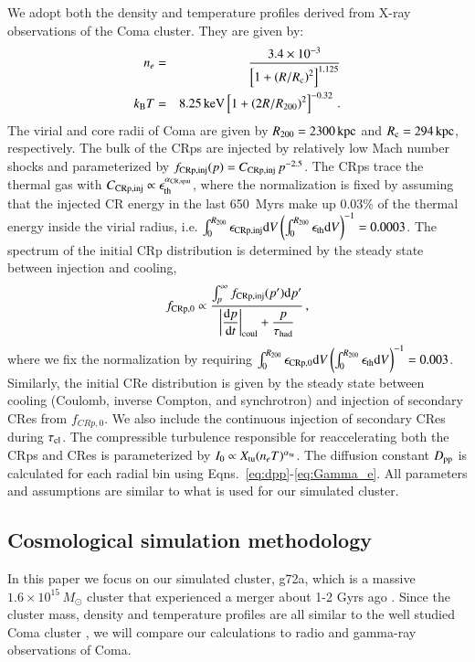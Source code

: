 \documentclass[fleqn,usenatbib,useAMS]{mnras}
\begin{document}
We adopt both the density \citep{1992A&A...259L..31B} and temperature
profiles \citep{2009ApJ...696.1886B,2001A&A...365L..67A} derived from
X-ray observations of the Coma cluster. They are given by:
\begin{eqnarray}
n_e &=& \frac{3.4\times10^{-3}}{\left[1+\left(R/R_{{\mathrm{c}}}\right)^2\right]^{1.125}}\nonumber\\
k_{{\mathrm{B}}} T &=& 8.25\,{\mathrm{keV}} \left[1+\left(2R/R_{200}\right)^2\right]^{-0.32}\,.
\end{eqnarray}
The virial and core radii of Coma are given by $R_{200} =
2300\,{\mathrm{kpc}}$ and $R_{{\mathrm{c}}} = 294\,{\mathrm{kpc}}$, respectively.
The bulk of the CRps are injected by relatively low Mach number shocks
and parameterized by $f_{\mathrm{CRp,inj}}(p) =
C_{\mathrm{CRp,inj}}\,p^{-2.5}$. The CRps trace the thermal gas with
$C_{\mathrm{CRp,inj}} \propto \epsilon_{\mathrm{th}}^{\alpha_{\mathrm{CR,spat}}}$,
where the normalization is fixed by assuming that the injected CR
energy in the last 650~Myrs make up 0.03\% of the thermal energy
inside the virial radius, i.e.
$\int_0^{R_{200}}\epsilon_{\mathrm{CRp,inj}} {\mathrm{d}}
V\left(\int_0^{R_{200}}\epsilon_{\mathrm{th}} {\mathrm{d}}V\right)^{-1} =
0.0003$. The spectrum of the initial CRp distribution is determined by
the steady state between injection and cooling,
\begin{equation}
 f_{\mathrm{CRp,0}} \propto \frac{\int_p^\infty f_{\mathrm{CRp,inj}}(p') 
{\mathrm{d}}p'}{\displaystyle\left|{{{\mathrm{d}}p}\over{{\mathrm{d}}t}}\right|_{\rm coul}+\frac{p}{\tau_{\rm had}}}\,,
\end{equation}
where we fix the normalization by requiring
$\int_0^{R_{200}}\epsilon_{\mathrm{CRp,0}}
{\mathrm{d}}V\left(\int_0^{R_{200}}\epsilon_{\mathrm{th}} {\mathrm{d}}V\right)^{-1} =
0.003$. Similarly, the initial CRe distribution is given by the steady
state between cooling (Coulomb, inverse Compton, and synchrotron) and
injection of secondary CRes from $f_{CRp,0}$. We also include the
continuous injection of secondary CRes during $\tau_{\mathrm{cl}}$. The
compressible turbulence responsible for reaccelerating both the CRps
and CRes is parameterized by $I_0 \propto X_{\mathrm{tu}} (n_e
T)^{\alpha_{\mathrm{tu}}}$. The diffusion constant $D_{\mathrm{pp}}$ is
calculated for each radial bin using
Eqns.~\ref{eq:dpp}-\ref{eq:Gamma_e}. All parameters and assumptions
are similar to what is used for our simulated cluster.

\subsection{Cosmological simulation methodology}
In this paper we focus on our simulated cluster, g72a, which is a
massive $1.6\times10^{15}\,M_\odot$ cluster that experienced a merger
about 1-2 Gyrs ago \citep{2009MNRAS.399..497D}. Since the cluster
mass, density and temperature profiles are all similar to the well
studied Coma cluster \citep{2007MNRAS.378..385P,pinzke10}, we will
compare our calculations to radio and gamma-ray observations of Coma.
\end{document}
